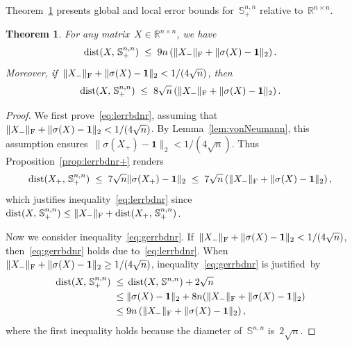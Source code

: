 \documentclass[11pt,a4paper]{article}  %
\newtheorem{theorem}{Theorem}%
\theoremstyle{definition}
\DeclareMathOperator{\dist}{dist}
\newcommand{\RR}{\mathbb{R}}
\newcommand{\col}{r}
\newcommand{\stf}[1]{\mathbb{S}^{#1}}
\newcommand{\fro}{{\scriptstyle{\textnormal{F}}}}
\newcommand{\ones}{\mathbf{1}}
\begin{document}
Theorem~\ref{th:errbdnr} presents global and local error bounds for~$\stf{n,n}_+$ relative to~$\RR^{n\times n}$.
\begin{theorem}%
    \label{th:errbdnr}%
        For any matrix~$X\!\!\in\RR^{n\times n}$, we have
        \begin{equation}
            \label{eq:gerrbdnr}
            \dist(X,\,\stf{n,n}_+) \;\le\; 9n\left( \|X_{-}\|_\fro + \|\sigma(X) -\ones\|_2 \right).
        \end{equation}
        Moreover, if~$\|X_{-}\|_\fro + \|\sigma(X) -\ones\|_2 < 1/(4\sqrt{n})$, then
        \begin{equation}
            \label{eq:lerrbdnr}
            \dist(X,\,\stf{n,n}_+) \;\le\; 8\sqrt{n}\left( \|X_{-}\|_\fro + \|\sigma(X) -\ones\|_2 \right).
        \end{equation}
\end{theorem}
\begin{proof}
    We first prove~\eqref{eq:lerrbdnr}, assuming that~$\|X_{-}\|_\fro + \|\sigma(X) -\ones\|_2 < 1/(4\sqrt{n})$.
    By Lemma~\ref{lem:vonNeumann}, this assumption ensures~$\|\sigma(X_+) -\ones\|_2< 1/(4\sqrt{n})$.
    Thus Proposition~\ref{prop:lerrbdnr+} renders%
    \begin{equation}
        \nonumber
        \begin{split}
        \dist(X_+, \, \stf{n,n}_+)
        \;\le\;  7\sqrt{n}\|\sigma(X_+)-\ones\|_2
        \;\le\;  7\sqrt{n}\left(\|X_{-}\|_\fro+\|\sigma(X)-\ones\|_2 \right),
        \end{split}
    \end{equation}
    which justifies inequality~\eqref{eq:lerrbdnr} since~$\dist(X, \, \stf{n,n}_+) \le \|X_{-} \|_\fro + \dist(X_+,\,\stf{n,n}_+)$.

    Now we consider inequality~\eqref{eq:gerrbdnr}. If~$\|X_{-}\|_\fro + \|\sigma(X) -\ones\|_2 < 1/(4\sqrt{n})$,
    then~\eqref{eq:gerrbdnr} holds due to~\eqref{eq:lerrbdnr}.
    When~$\|X_{-}\|_\fro + \|\sigma(X) -\ones\|_2 \ge 1/(4\sqrt{n})$,
    inequality~\eqref{eq:gerrbdnr} is justified~by%
    \begin{equation}
        \nonumber
        \begin{split}
            \dist(X,\,\stf{n,n}_+)
        \;\le\; & \dist(X,\,\stf{n,n}) + 2\sqrt{n} \\
        \;\le\; & \|\sigma(X)-\ones\|_2 + 8n(\|X_{-}\|_\fro + \|\sigma(X) -\ones\|_2) \\
        \;\le\; & 9n\left( \|X_{-}\|_\fro + \|\sigma(X) -\ones\|_2 \right),
        \end{split}
    \end{equation}
    where the first inequality holds because the diameter of~$\stf{n,n}$ is~$2\sqrt{n}$.
\end{proof}
\end{document}
